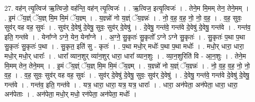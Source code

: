 \documentclass[17pt]{extarticle}
\begin{document}
27. वह॑न् त्यृ॒त्विज॑ ऋ॒त्विजो॒ वह॑न्ति॒ वह॑न् त्यृ॒त्विजः॑ । . ऋ॒त्विज॒ इत्यृ॒त्विजः॑ । . तेने॒म मि॒मम् तेन॒ तेने॒मम् । . इ॒मं ॅय॒ज्ञ्ं ॅय॒ज्ञ् मि॒म मि॒मं ॅय॒ज्ञ्म् । . य॒ज्ञ्न्नो॑ नो य॒ज्ञ्ं ॅय॒ज्ञ्न्नः॑ । . नो॒ व॒ह॒ व॒ह॒ नो॒ नो॒ व॒ह॒ । . व॒ह॒ सुवः॒ सुव॑र् वह वह॒ सुवः॑ । . सुव॑र् दे॒वेषु॑ दे॒वेषु॒ सुवः॒ सुव॑र् दे॒वेषु॑ । . दे॒वेषु॒ गन्त॑वे॒ गन्त॑वे दे॒वेषु॑ दे॒वेषु॒ गन्त॑वे । . गन्त॑व॒ इति॒ गन्त॑वे । . येना᳚ग्ने ऽग्ने॒ येन॒ येना᳚ग्ने । . अ॒ग्ने॒ सु॒कृतः॑ सु॒कृतो᳚ ऽग्ने ऽग्ने सु॒कृतः॑ । . सु॒कृतः॑ प॒था प॒था सु॒कृतः॑ सु॒कृतः॑ प॒था । . सु॒कृत॒ इति॑ सु - कृतः॑ । . प॒था मधो॒र् मधोः᳚ प॒था प॒था मधोः᳚ । . मधो॒र् धारा॒ धारा॒ मधो॒र् मधो॒र् धाराः᳚ । . धारा᳚ व्यान॒शुर् व्या॑न॒शुर् धारा॒ धारा᳚ व्यान॒शुः । . व्या॒न॒शुरिति॑ वि - आ॒न॒शुः । . तेने॒म मि॒मम् तेन॒ तेने॒मम् । . इ॒मं ॅय॒ज्ञ्ं ॅय॒ज्ञ् मि॒म मि॒मं ॅय॒ज्ञ्म् । . य॒ज्ञ्न्नो॑ नो य॒ज्ञ्ं ॅय॒ज्ञ्न्नः॑ । . नो॒ व॒ह॒ व॒ह॒ नो॒ नो॒ व॒ह॒ । . व॒ह॒ सुवः॒ सुव॑र् वह वह॒ सुवः॑ । . सुव॑र् दे॒वेषु॑ दे॒वेषु॒ सुवः॒ सुव॑र् दे॒वेषु॑ । . दे॒वेषु॒ गन्त॑वे॒ गन्त॑वे दे॒वेषु॑ दे॒वेषु॒ गन्त॑वे । . गन्त॑व॒ इति॒ गन्त॑वे । . यत्र॒ धारा॒ धारा॒ यत्र॒ यत्र॒ धाराः᳚ । . धारा॒ अन॑पेता॒ अन॑पेता॒ धारा॒ धारा॒ अन॑पेताः । . अन॑पेता॒ मधो॒र् मधो॒ रन॑पेता॒ अन॑पेता॒ मधोः᳚ । \newline
\end{document}
